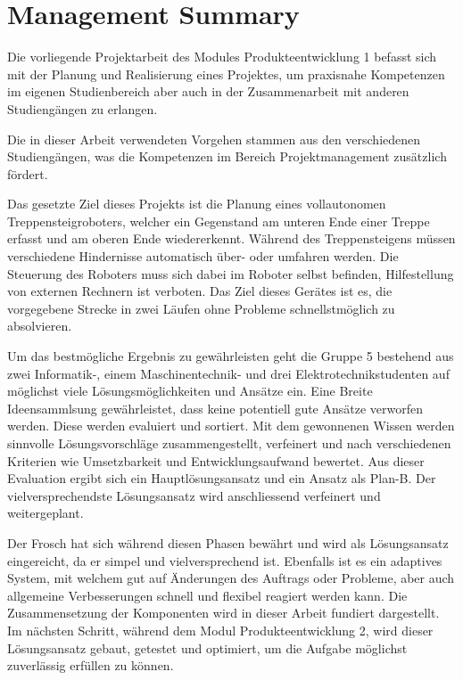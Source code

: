 \section*{Management Summary}
Die vorliegende Projektarbeit des Modules Produkteentwicklung 1 befasst sich mit der Planung und Realisierung eines Projektes, um praxisnahe Kompetenzen im eigenen Studienbereich aber auch in der Zusammenarbeit mit anderen Studiengängen zu erlangen.

Die in dieser Arbeit verwendeten Vorgehen stammen aus den verschiedenen Studiengängen, was die Kompetenzen im Bereich Projektmanagement zusätzlich fördert.

Das gesetzte Ziel dieses Projekts ist die Planung eines vollautonomen Treppensteigroboters, welcher ein Gegenstand am unteren Ende einer Treppe erfasst und am oberen Ende wiedererkennt. Während des Treppensteigens müssen verschiedene Hindernisse automatisch über- oder umfahren werden. Die Steuerung des Roboters muss sich dabei im Roboter selbst befinden, Hilfestellung von externen Rechnern ist verboten. Das Ziel dieses Gerätes ist es, die vorgegebene Strecke in zwei Läufen ohne Probleme schnellstmöglich zu absolvieren.

Um das bestmögliche Ergebnis zu gewährleisten geht die Gruppe 5 bestehend aus zwei Informatik-, einem Maschinentechnik- und drei Elektrotechnikstudenten auf möglichst viele Lösungsmöglichkeiten und Ansätze ein. Eine Breite Ideensammlsung gewährleistet, dass keine potentiell gute Ansätze verworfen werden. Diese werden evaluiert und sortiert. Mit dem gewonnenen Wissen werden sinnvolle Lösungsvorschläge zusammengestellt, verfeinert und nach verschiedenen Kriterien wie Umsetzbarkeit und Entwicklungsaufwand bewertet. Aus dieser Evaluation ergibt sich ein Hauptlösungsansatz und ein Ansatz als Plan-B. Der vielversprechendste Lösungsansatz wird anschliessend verfeinert und weitergeplant.

Der \glqq Frosch\grqq{} hat sich während diesen Phasen bewährt und wird als Lösungsansatz eingereicht, da er simpel und vielversprechend ist. Ebenfalls ist es ein adaptives System, mit welchem gut auf Änderungen des Auftrags oder Probleme, aber auch allgemeine Verbesserungen schnell und flexibel reagiert werden kann. Die Zusammensetzung der Komponenten wird in dieser Arbeit fundiert dargestellt.
Im nächsten Schritt, während dem Modul Produkteentwicklung 2, wird dieser Lösungsansatz gebaut, getestet und optimiert, um die Aufgabe möglichst zuverlässig erfüllen zu können.
